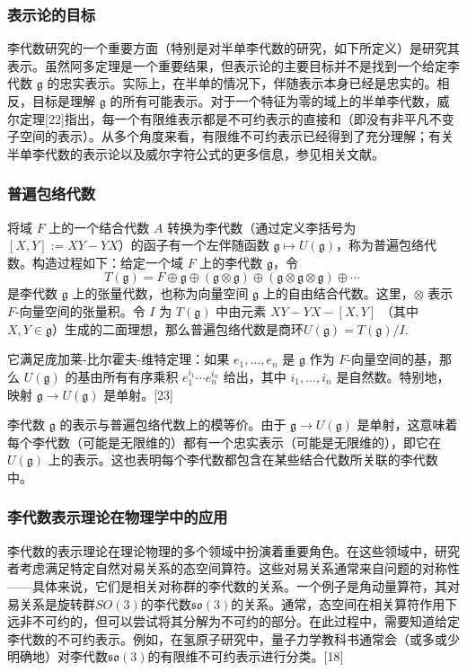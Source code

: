 \subsubsection{表示论的目标}  
李代数研究的一个重要方面（特别是对半单李代数的研究，如下所定义）是研究其表示。虽然阿多定理是一个重要结果，但表示论的主要目标并不是找到一个给定李代数 \( \mathfrak{g} \) 的忠实表示。实际上，在半单的情况下，伴随表示本身已经是忠实的。相反，目标是理解 \( \mathfrak{g} \) 的所有可能表示。对于一个特征为零的域上的半单李代数，威尔定理[22]指出，每一个有限维表示都是不可约表示的直接和（即没有非平凡不变子空间的表示）。从多个角度来看，有限维不可约表示已经得到了充分理解；有关半单李代数的表示论以及威尔字符公式的更多信息，参见相关文献。
\subsubsection{普遍包络代数 } 
将域 \( F \) 上的一个结合代数 \( A \) 转换为李代数（通过定义李括号为 \( [X,Y] := XY - YX \)）的函子有一个左伴随函数 \( \mathfrak{g} \mapsto U(\mathfrak{g}) \)，称为普遍包络代数。构造过程如下：给定一个域 \( F \) 上的李代数 \( \mathfrak{g} \)，令  
\[
T(\mathfrak{g}) = F \oplus \mathfrak{g} \oplus (\mathfrak{g} \otimes \mathfrak{g}) \oplus (\mathfrak{g} \otimes \mathfrak{g} \otimes \mathfrak{g}) \oplus \cdots~
\]  
是李代数 \( \mathfrak{g} \) 上的张量代数，也称为向量空间 \( \mathfrak{g} \) 上的自由结合代数。这里，\( \otimes \) 表示 \( F \)-向量空间的张量积。令 \( I \) 为 \( T(\mathfrak{g}) \) 中由元素 \( XY - YX - [X,Y] \) （其中 \( X, Y \in \mathfrak{g} \)）生成的二面理想，那么普遍包络代数是商环\(U(\mathfrak{g}) = T(\mathfrak{g}) / I\).

它满足庞加莱-比尔霍夫-维特定理：如果 \( e_1, \dots, e_n \) 是 \( \mathfrak{g} \) 作为 \( F \)-向量空间的基，那么 \( U(\mathfrak{g}) \) 的基由所有有序乘积 \( e_1^{i_1} \cdots e_n^{i_n} \) 给出，其中 \( i_1, \dots, i_n \) 是自然数。特别地，映射 \( \mathfrak{g} \to U(\mathfrak{g}) \) 是单射。[23]

李代数 \( \mathfrak{g} \) 的表示与普遍包络代数上的模等价。由于 \( \mathfrak{g} \to U(\mathfrak{g}) \) 是单射，这意味着每个李代数（可能是无限维的）都有一个忠实表示（可能是无限维的），即它在 \( U(\mathfrak{g}) \) 上的表示。这也表明每个李代数都包含在某些结合代数所关联的李代数中。
\subsubsection{李代数表示理论在物理学中的应用}  
李代数的表示理论在理论物理的多个领域中扮演着重要角色。在这些领域中，研究者考虑满足特定自然对易关系的态空间算符。这些对易关系通常来自问题的对称性——具体来说，它们是相关对称群的李代数的关系。一个例子是角动量算符，其对易关系是旋转群\(SO(3)\)的李代数\(\mathfrak{so}(3)\)的关系。通常，态空间在相关算符作用下远非不可约的，但可以尝试将其分解为不可约的部分。在此过程中，需要知道给定李代数的不可约表示。例如，在氢原子研究中，量子力学教科书通常会（或多或少明确地）对李代数\(\mathfrak{so}(3)\)的有限维不可约表示进行分类。[18]
